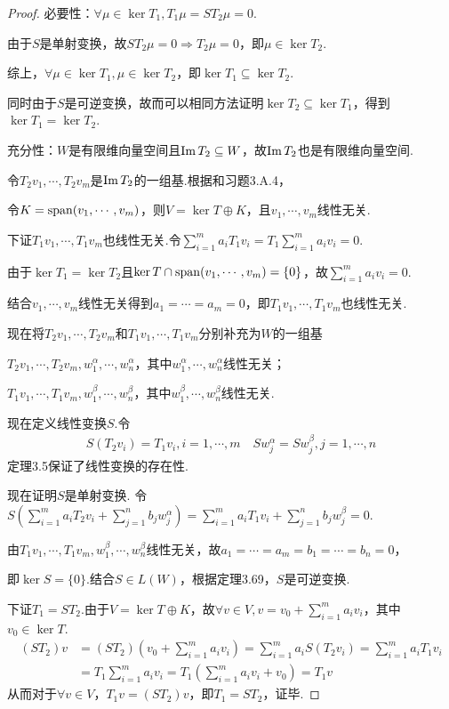 \begin{proof}
    必要性：\(\forall \mu \in \ker T_1,T_1 \mu=ST_2 \mu =0\).

    由于\(S\)是单射变换，故\(ST_2 \mu =0 \Rightarrow T_2 \mu =0\)，即\(\mu \in \ker T_2\).
    
    综上，\(\forall \mu \in \ker T_1, \mu \in \ker T_2\)，即\(\ker T_1 \subseteq \ker T_2\).
    
    同时由于\(S\)是可逆变换，故而可以相同方法证明\(\ker T_2 \subseteq \ker T_1\)，得到\(\ker T_1=\ker T_2\).
    
    充分性：\(W\)是有限维向量空间且\(\operatorname{Im} T_2 \subseteq W\)，故\(\operatorname{Im} T_2\)也是有限维向量空间.
    
    令\(T_2v_1,\cdots,T_2v_m\)是\(\operatorname{Im} T_2\)的一组基.根据和习题3.A.4，%
    
    令\(K=\operatorname{span} (v_1,\cdots,v_m)\)，则\(V=\ker T \oplus K\)，且\(v_1,\cdots,v_m\)线性无关.
    
    下证\(T_1v_1,\cdots,T_1v_m\)也线性无关.令\(\sum_{i=1}^m a_iT_1v_i=T_1\sum_{i=1}^m a_iv_i=0\).
    
    由于\(\ker T_1=\ker T_2\)且\(\ker T \cap \operatorname{span} (v_1,\cdots,v_m)=\{0\}\)，故\(\sum_{i=1}^m a_iv_i=0\).
    
    结合\(v_1,\cdots,v_m\)线性无关得到\(a_1=\cdots=a_m=0\)，即\(T_1v_1,\cdots,T_1v_m\)也线性无关.
    
    现在将\(T_2v_1,\cdots,T_2v_m\)和\(T_1v_1,\cdots,T_1v_m\)分别补充为\(W\)的一组基
    
    \(T_2v_1,\cdots,T_2v_m,w_1^\alpha,\cdots,w_n^\alpha\)，其中\(w_1^\alpha,\cdots,w_n^\alpha\)线性无关；
    
    \(T_1v_1,\cdots,T_1v_m,w_1^\beta,\cdots,w_n^\beta\)，其中\(w_1^\beta,\cdots,w_n^\beta\)线性无关.
    
    现在定义线性变换\(S\).令
    \begin{align*}
        S(T_2v_i)=T_1v_i,i=1,\cdots,m \quad Sw_j^\alpha=Sw_j^\beta,j=1,\cdots,n
    \end{align*}
    定理3.5保证了线性变换的存在性.
    
    现在证明\(S\)是单射变换.
    令\(S(\sum_{i=1}^m a_iT_2v_i+\sum_{j=1}^n b_jw_j^\alpha)=\sum_{i=1}^m a_iT_1v_i+\sum_{j=1}^n b_jw_j^\beta=0\).
    
    由\(T_1v_1,\cdots,T_1v_m,w_1^\beta,\cdots,w_n^\beta\)线性无关，故\(a_1=\cdots=a_m=b_1=\cdots=b_n=0\)，
    
    即\(\ker S=\{0\}\).结合\(S \in L(W)\)，根据定理3.69，\(S\)是可逆变换.
    
    下证\(T_1=ST_2\).由于\(V=\ker T \oplus K\)，故\(\forall v \in V,v=v_0+\sum_{i=1}^m a_iv_i\)，其中\(v_0 \in \ker T\).
    \begin{align*}
        (ST_2)v&=(ST_2)(v_0+\sum_{i=1}^m a_iv_i)=\sum_{i=1}^m a_iS(T_2v_i)=\sum_{i=1}^m a_iT_1v_i \\
            &=T_1\sum_{i=1}^m a_iv_i=T_1(\sum_{i=1}^m a_iv_i+v_0)=T_1v
    \end{align*}
    从而对于\(\forall v \in V\)，\(T_1v=(ST_2)v\)，即\(T_1=ST_2\)，证毕.    
\end{proof}

